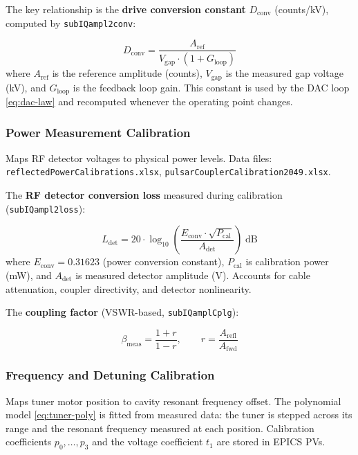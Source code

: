 The key relationship is the \textbf{drive conversion constant} \(D_\text{conv}\) (counts/kV), computed by \texttt{subIQampl2conv}:

\begin{equation}\label{eq:dconv}
D_\text{conv} = \frac{A_\text{ref}}{V_\text{gap} \cdot (1 + G_\text{loop})}
\end{equation}
where \(A_\text{ref}\) is the reference amplitude (counts), \(V_\text{gap}\) is the measured gap voltage (kV), and \(G_\text{loop}\) is the feedback loop gain. This constant is used by the DAC loop \eqref{eq:dac-law} and recomputed whenever the operating point changes.

\subsubsection{Power Measurement Calibration}\label{sec:cal-power}


Maps RF detector voltages to physical power levels. Data files: \texttt{reflectedPowerCalibrations.\allowbreak{}xlsx}, \texttt{pulsarCouplerCalibration2049.\allowbreak{}xlsx}.

The \textbf{RF detector conversion loss} measured during calibration (\texttt{subIQampl2loss}):

\begin{equation}\label{eq:det-loss}
L_\text{det} = 20 \cdot \log_{10}\!\left(\frac{E_\text{conv} \cdot \sqrt{P_\text{cal}}}{A_\text{det}}\right) \;\text{dB}
\end{equation}
where \(E_\text{conv} = 0.31623\) (power conversion constant), \(P_\text{cal}\) is calibration power (mW), and \(A_\text{det}\) is measured detector amplitude (V). Accounts for cable attenuation, coupler directivity, and detector nonlinearity.

The \textbf{coupling factor} (VSWR-based, \texttt{subIQamplCplg}):

\begin{equation}\label{eq:beta-meas}
\beta_\text{meas} = \frac{1 + r}{1 - r}, \qquad r = \frac{A_\text{refl}}{A_\text{fwd}}
\end{equation}

\subsubsection{Frequency and Detuning Calibration}\label{sec:cal-freq}


Maps tuner motor position to cavity resonant frequency offset. The polynomial model \eqref{eq:tuner-poly} is fitted from measured data: the tuner is stepped across its range and the resonant frequency measured at each position. Calibration coefficients \(p_0, \ldots, p_3\) and the voltage coefficient \(t_1\) are stored in EPICS PVs.


